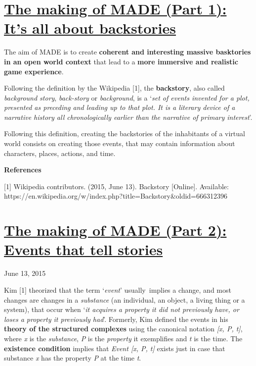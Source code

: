 \documentclass[a4paper]{article}
\title{}
\author{}
\date{2015-09-27T17:26:35.118163052}
\newcommand\textstyleStrongEmphasis[1]{\textbf{#1}}
\newcommand\textstyleEmphasis[1]{\textit{#1}}
\begin{document}
\section[The making of MADE (Part 1): It{\textquoteright}s all about
backstories]{\href{http://www.velonuboso.com/made/2015/06/13/making-part-1-events-facts-deductions-backstories/}{The
making of MADE (Part 1): It{\textquoteright}s all about backstories}}
The aim of MADE is to create \textstyleStrongEmphasis{coherent and
interesting massive basktories in an open world context} that lead to a
\textstyleStrongEmphasis{more immersive and realistic game experience}.

Following the definition by the Wikipedia [1], the
\textstyleStrongEmphasis{backstory}, also called
\textstyleEmphasis{background story}, \textstyleEmphasis{back-story} or
\textstyleEmphasis{background}, is a
{\textquoteleft}\textstyleEmphasis{set of events invented for a plot,
presented as preceding and leading up to that plot. It is a literary
device of a narrative history all chronologically earlier than the
narrative of primary interest}{\textquoteright}.

Following this definition, creating the backstories of the inhabitants
of a virtual world consists on creating those events, that may contain
information about characters, places, actions, and time.

{\bfseries
References}

[1] Wikipedia contributors. (2015, June 13). Backstory [Online].
Available:
https://en.wikipedia.org/w/index.php?title=Backstory\&oldid=666312396


\bigskip

\clearpage\section[The making of MADE (Part 2): Events that tell
stories]{\href{http://www.velonuboso.com/made/2015/06/13/making-part-2-events-tells-stories/}{The
making of MADE (Part 2): Events that tell stories}}
June 13, 2015

Kim [1] theorized that the term
{\textquoteleft}\textstyleEmphasis{event}{\textquoteright}
usually~implies a change, and most changes are changes in a
\textstyleEmphasis{substance} (an individual, an object, a living thing
or a system), that occur when {\textquoteleft}\textstyleEmphasis{it
acquires a property it did not previously have, or loses a property it
previously had}{\textquoteright}. Formerly, Kim defined the events in
his \textstyleStrongEmphasis{theory of the structured complexes} using
the canonical notation \textstyleEmphasis{[x, P, t]}, where
\textstyleEmphasis{x} is the \textstyleEmphasis{substance},
\textstyleEmphasis{P} is the \textstyleEmphasis{property} it
exemplifies and \textstyleEmphasis{t} is the time. The
\textstyleStrongEmphasis{existence condition} implies that
\textstyleEmphasis{Event [x, P, t]} exists just in case that substance
\textstyleEmphasis{x} has the property \textstyleEmphasis{P} at the
time \textstyleEmphasis{t}.
\end{document}
